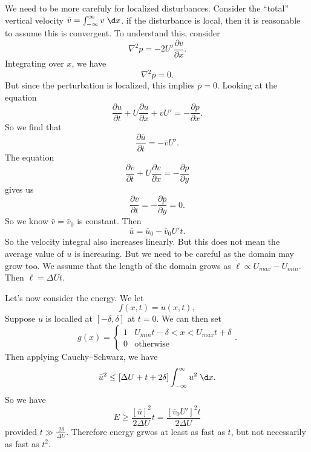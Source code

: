 \documentclass[a4paper]{article}
\begin{document}
We need to be more carefuly for localized disturbances. Consider the ``total'' vertical velocity $\bar{v} = \int_{-\infty}^\infty v\;\d x$. if the disturbance is local, then it is reasonable to assume this is convergent. To understand this, consider
\[
  \nabla^2 p = - 2U' \frac{\partial v}{\partial x}.
\]
Integrating over $x$, we have
\[
  \nabla^2 \bar{p} = 0.
\]
But since the perturbation is localized, this implies $\bar{p} = 0$. Looking at the equation
\[
  \frac{\partial u}{\partial t} + U \frac{\partial u}{\partial x} + v U' = - \frac{\partial p}{\partial x}.
\]
So we find that
\[
  \frac{\partial \bar{u}}{\partial t} = - \bar{v} U'.
\]
The equation
\[
  \frac{\partial v}{\partial t} + U \frac{\partial v}{\partial x} = - \frac{\partial p}{\partial y}
\]
gives us
\[
  \frac{\partial \bar{v}}{\partial t} = - \frac{\partial \bar{p}}{\partial y} = 0.
\]
So we know $\bar{v} = \bar{v}_0$ is constant. Then
\[
  \bar{u} = \bar{u}_0 - \bar{v}_0 U' t.
\]
So the velocity integral also increases linearly. But this does not mean the average value of $u$ is increasing. But we need to be careful as the domain may grow too. We assume that the length of the domain grows as $\dot{\ell} \propto U_{max} - U_{min}$. Then $\ell = \Delta U t$.

Let's now consider the energy. We let
\[
  f(x, t) = u(x, t),
\]
Suppose $u$ is localled at $[-\delta, \delta]$ at $t = 0$. We can then set
\[
  g(x) =
  \begin{cases}
    1 & U_{min} t - \delta < x < U_{max} t + \delta\\
    0 & \text{otherwise}
  \end{cases}.
\]
Then applying Cauchy--Schwarz, we have
\[
  \bar{u}^2 \leq [\Delta U + t + 2\delta] \int_{-\infty}^\infty u^2 \;\d x.
\]
So we have
\[
  E \geq \frac{[\bar{u}]^2}{2 \Delta U}t = \frac{[\bar{v}_0 U']^2 t}{2 \Delta U}
\]
provided $t \gg \frac{2\delta}{\Delta U}$. Therefore energy grwos at least as fast as $t$, but not necessarily as fast as $t^2$.
\printindex
\end{document}
